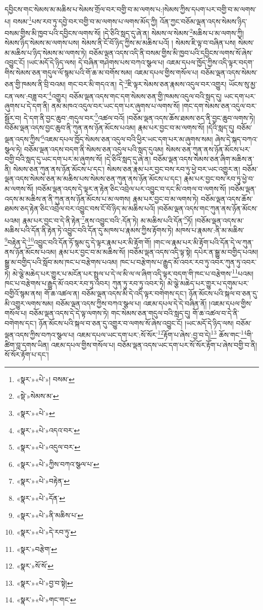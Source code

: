 དབྱིངས་གང་སེམས་མ་མཆིས་པ་སེམས་གྲོལ་བར་བགྱི་བ་མ་ལགས་པ:།སེམས་ཀྱིས་དཔག་པར་བགྱི་བ་མ་ལགས་པ། བསམ་\footnote{«སྣར་»«པེ་»། བསམ་}པས་རབ་ཏུ་དབྱེ་བར་བགྱི་བ་མ་ལགས་པ་ལགས་མོད་ཀྱི། འོན་ཀྱང་བཅོམ་ལྡན་འདས་སེམས་ཉིད་བསམ་གྱིས་མི་ཁྱབ་པའི་དབྱིངས་ལགས་སོ། །དེ་ཅིའི་སླད་དུ་ཞེ་ན། སེམས་ལ་སེམས་\footnote{«སྡེ་»སེམས་མ་}མཆིས་པ་མ་ལགས་ཀྱི། སེམས་ཉིད་སེམས་མ་ལགས་པས། སེམས་ནི་ངོ་བོ་ཉིད་ཀྱིས་མ་མཆིས་པའོ། །
སེམས་ཇི་ལྟ་བ་བཞིན་པས། སེམས་མ་མཆིས་པ་ཉིད་སེམས་མ་ལགས་ཏེ། བཅོམ་ལྡན་འདས་འདི་ནི་བསམ་གྱིས་མི་ཁྱབ་པའི་དབྱིངས་ལགས་སོ་ཞེས་འབྱུང་ངོ། །ཡང་མདོ་དེ་ཉིད་ལས། དེ་བཞིན་གཤེགས་པས་བཀའ་སྩལ་པ། འཇམ་དཔལ་ཁྱོད་ཀྱིས་འདི་ལྟར་བདག་གིས་སེམས་ཅན་གདུལ་ལོ་སྙམ་པའི་གོ་ཆ་མ་བགོས་སམ། འཇམ་དཔལ་གྱིས་གསོལ་པ། བཅོམ་ལྡན་འདས་སེམས་ཅན་གྱི་ཁམས་ནི་བྲི་བའམ། གང་བར་མི་གདའ་ན། དེ་\footnote{«སྣར་»«པེ་»}ཇི་ལྟར་སེམས་ཅན་རྣམས་འདུལ་བར་འགྱུར། ཡོངས་སུ་མྱ་ངན་ལས་:བཟླ་བར་\footnote{«སྣར་»«པེ་»འདའ་བར་}འགྱུར། བཅོམ་ལྡན་འདས་གང་དག་སེམས་ཅན་གྱི་ཁམས་འདུལ་བའི་སླད་དུ། ཡང་དག་པར་ཞུགས་པ་དེ་དག་ནི། ནམ་མཁའ་འདུལ་བར་ཡང་དག་པར་ཞུགས་པ་ལགས་སོ། །གང་དག་སེམས་ཅན་འདུལ་བར་སྦྱོར་བ། དེ་དག་ནི་བྱང་ཆུབ་:གདུལ་བར་\footnote{«སྣར་»«པེ་»འདུལ་བར་}འཚལ་བའོ། །བཅོམ་ལྡན་འདས་ཆོས་ཐམས་ཅད་ནི་བྱང་ཆུབ་ལགས་ཏེ། བཅོམ་ལྡན་འདས་བྱང་ཆུབ་ནི་ཀུན་ནས་ཉོན་མོངས་པའམ། རྣམ་པར་བྱང་བ་མ་ལགས་སོ། །དེའི་སླད་དུ། བཅོམ་ལྡན་འདས་ཀྱིས་\footnote{«སྣར་»«པེ་»ཀྱིས་བཀའ་སྩལ་པ་}འཇམ་དཔལ་ཁྱོད་སེམས་ཅན་འདུལ་བའི་ཕྱིར་ཡང་དག་པར་མ་ཞུགས་སམ། ཞེས་དེ་སྐད་བཀའ་སྩལ་ཏེ། བཅོམ་ལྡན་འདས་བདག་ནི་སེམས་ཅན་འདུལ་པའི་སླད་དུའམ། སེམས་ཅན་ཀུན་ནས་ཉོན་མོངས་པར་བགྱི་བའི་སླད་དུ་ཡང་དག་པར་མ་ཞུགས་སོ། །དེ་ཅིའི་སླད་དུ་ཞེ་ན། བཅོམ་ལྡན་འདས་སེམས་ཅན་ཞིག་མཆིས་ན་ནི། སེམས་ཅན་ཀུན་ནས་ཉོན་མོངས་པ་དང་། སེམས་ཅན་རྣམ་པར་བྱང་བས་རབ་ཏུ་ཕྱེ་བར་ཡང་འགྱུར་ན། བཅོམ་ལྡན་འདས་སེམས་ཅན་མ་མཆིས་པས་སེམས་ཅན་ཀུན་ནས་ཉོན་མོངས་པ་དང་། རྣམ་པར་བྱང་བས་རབ་ཏུ་ཕྱེ་བ་མ་ལགས་སོ། །བཅོམ་ལྡན་འདས་དེ་ལྟར་ན་རྟེན་ཅིང་འབྲེལ་པར་འབྱུང་བ་དང་མི་འགལ་བ་ལགས་སོ། །བཅོམ་ལྡན་འདས་མ་མཆིས་ན་ནི་ཀུན་ནས་ཉོན་མོངས་པ་མ་ལགས། རྣམ་པར་བྱང་བ་མ་ལགས་ཏེ། བཅོམ་ལྡན་འདས་ཆོས་ཐམས་ཅད་རྟེན་ཅིང་འབྲེལ་བར་འབྱུང་བས་ངོ་བོ་ཉིད་མ་མཆིས་པའོ། །བཅོམ་ལྡན་འདས་གང་ཀུན་ནས་ཉོན་མོངས་པའམ། རྣམ་པར་བྱང་བ་དེ་ནི་རྟེན་\footnote{«སྣར་»«པེ་»བརྟེན་}ནས་འབྱུང་བའི་:དོན་ཏེ། མ་མཆིས་པའི་དོན་\footnote{«སྣར་»«པེ་»དོན་}ཏོ། །བཅོམ་ལྡན་འདས་མ་མཆིས་པའི་དོན་ནི་རྟེན་ཏེ་འབྱུང་བའི་དོན་དུ་མཁས་པ་རྣམས་ཀྱིས་རྟོགས་ཏེ། མཁས་པ་རྣམས་:ནི་མ་མཆིས་\footnote{«སྣར་»«པེ་»ནི་མཆིས་པ་}བརྟེན་དེ་\footnote{«སྣར་»«པེ་»དེ་རབ་ཏུ་}འབྱུང་བའི་དོན་ཏོ་སྙམ་དུ་དེ་ལྟར་རྣམ་པར་མི་རྟོག་གོ། །གང་ལ་རྣམ་པར་མི་རྟོག་པའི་དོན་དེ་ལ་ཀུན་ནས་ཉོན་མོངས་པའམ། རྣམ་པར་བྱང་བ་མ་མཆིས་སོ། །བཅོམ་ལྡན་འདས་འདི་ལྟ་སྟེ། དཔེར་ན་སྒྱུ་མ་བགྱིད་པའམ། སྒྱུ་མ་བགྱིད་པའི་སློབ་མས་ཁང་པ་བརྩེགས་པའམ། ཁང་པ་བརྩེགས་པ་རྒྱུད་མོ་འབར་རབ་ཏུ་འབར་ཀུན་ཏུ་འབར་ཏེ། མེ་ལྕེ་མཆེད་པར་གྱུར་པ་མངོན་པར་སྤྲུལ་པ་དེ་ལ་མི་ལ་ལ་ཞིག་འདི་ལྟར་བདག་གི་ཁང་པ་བརྩེགས་\footnote{«སྣར་»བརྩེག་}པའམ། ཁང་པ་བརྩེགས་པ་རྒྱུད་མོ་འབར་རབ་ཏུ་འབར། ཀུན་ཏུ་རབ་ཏུ་འབར་ཏེ། མེ་ལྕེ་མཆེད་པར་གྱུར་པ་དགུམ་པར་བགྱིའོ་སྙམ་ནས། གོ་ཆ་འཚལ་ན། བཅོམ་ལྡན་འདས་མི་དེ་འདི་ལྟར་བགེགས་དང་། ཉོན་མོངས་པའི་སྐལ་བ་ཅན་དུ་མི་འགྱུར་ལགས་སམ། བཅོམ་ལྡན་འདས་ཀྱིས་བཀའ་སྩལ་པ། འཇམ་དཔལ་དེ་དེ་བཞིན་ནོ། །འཇམ་དཔལ་གྱིས་གསོལ་པ། བཅོམ་ལྡན་འདས་དེ་དེ་ལྟ་ལགས་ཏེ། གང་སེམས་ཅན་གདུལ་བའི་སླད་དུ། གོ་ཆ་འཚལ་བ་དེ་ནི་བགེགས་དང་། ཉོན་མོངས་པའི་སྐལ་བ་ཅན་དུ་འགྱུར་བ་ལགས་སོ་ཞེས་འབྱུང་ངོ། །ཡང་མདོ་དེ་ཉིད་ལས། བཅོམ་ལྡན་འདས་ཀྱིས་བཀའ་སྩལ་པ། འཇམ་དཔལ་ཡང་དག་པར་:སོ་སོར་\footnote{«སྣར་»སོ་སོ་}རྟོག་པ་ཞེས་:བྱ་བ་དེ།\footnote{«སྣར་»«པེ་»བྱ་བ་སྟེ།} ཆོས་གང་\footnote{«སྣར་»«པེ་»གང་གང་}གི་ཚིག་བླ་དགས་ཡིན། འཇམ་དཔལ་གྱིས་གསོལ་པ། བཅོམ་ལྡན་འདས་ཡང་དག་པར་སོ་སོར་རྟོག་པ་ཞེས་བགྱི་བ་ནི། སོ་སོར་རྟོག་པ་དང་། 